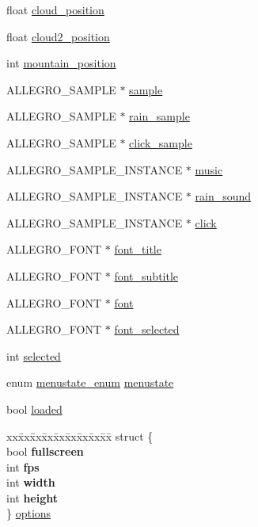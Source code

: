 \begin{DoxyCompactItemize}
\item 
float \hyperlink{structMenu_a0e6c60743147ff2ead1e0bb2f89d0036}{cloud\-\_\-position}
\item 
float \hyperlink{structMenu_a143c3675204c7cf1381decbfe4be5476}{cloud2\-\_\-position}
\item 
int \hyperlink{structMenu_a10770a9453a92c77d64c7fdb0e34e725}{mountain\-\_\-position}
\item 
\-A\-L\-L\-E\-G\-R\-O\-\_\-\-S\-A\-M\-P\-L\-E $\ast$ \hyperlink{structMenu_a19a25811d2d08b8fa1d1819088168b72}{sample}
\item 
\-A\-L\-L\-E\-G\-R\-O\-\_\-\-S\-A\-M\-P\-L\-E $\ast$ \hyperlink{structMenu_ad14705d9172d76dc241de8f4657254cc}{rain\-\_\-sample}
\item 
\-A\-L\-L\-E\-G\-R\-O\-\_\-\-S\-A\-M\-P\-L\-E $\ast$ \hyperlink{structMenu_a012f284df5f9d8e39785a264c736c506}{click\-\_\-sample}
\item 
\-A\-L\-L\-E\-G\-R\-O\-\_\-\-S\-A\-M\-P\-L\-E\-\_\-\-I\-N\-S\-T\-A\-N\-C\-E $\ast$ \hyperlink{structMenu_a7b8c42bd64118eb18dceafbd9ac8b3d5}{music}
\item 
\-A\-L\-L\-E\-G\-R\-O\-\_\-\-S\-A\-M\-P\-L\-E\-\_\-\-I\-N\-S\-T\-A\-N\-C\-E $\ast$ \hyperlink{structMenu_a31b58f4005206ba8ecc4b6f40223295f}{rain\-\_\-sound}
\item 
\-A\-L\-L\-E\-G\-R\-O\-\_\-\-S\-A\-M\-P\-L\-E\-\_\-\-I\-N\-S\-T\-A\-N\-C\-E $\ast$ \hyperlink{structMenu_a8f8e8b511a64f03e71259dde1a7bf6f2}{click}
\item 
\-A\-L\-L\-E\-G\-R\-O\-\_\-\-F\-O\-N\-T $\ast$ \hyperlink{structMenu_aac0297cac51099ec75020a510a6dcbb3}{font\-\_\-title}
\item 
\-A\-L\-L\-E\-G\-R\-O\-\_\-\-F\-O\-N\-T $\ast$ \hyperlink{structMenu_a18d7377e798bac336e55e253243d4e13}{font\-\_\-subtitle}
\item 
\-A\-L\-L\-E\-G\-R\-O\-\_\-\-F\-O\-N\-T $\ast$ \hyperlink{structMenu_aa4e0229cb315ef9e0ea90263b26a37f8}{font}
\item 
\-A\-L\-L\-E\-G\-R\-O\-\_\-\-F\-O\-N\-T $\ast$ \hyperlink{structMenu_a577ad17dfddafaae41dde63ca7970003}{font\-\_\-selected}
\item 
int \hyperlink{structMenu_a608e2768a5458057048bf1c7ab9a81aa}{selected}
\item 
enum \hyperlink{main_8h_a5b988954c565e5ff444d61085e367fae}{menustate\-\_\-enum} \hyperlink{structMenu_a6c264952ac073cf2f290de86a677c876}{menustate}
\item 
bool \hyperlink{structMenu_afd245b822f2805677609fc0f78ee59ac}{loaded}
\item 
\begin{tabbing}
xx\=xx\=xx\=xx\=xx\=xx\=xx\=xx\=xx\=\kill
struct \{\\
\>bool {\bfseries fullscreen}\\
\>int {\bfseries fps}\\
\>int {\bfseries width}\\
\>int {\bfseries height}\\
\} \hyperlink{structMenu_a6ee9749efa96939d50728015a3fd6609}{options}\\


\end{tabbing}
\end{DoxyCompactItemize}
